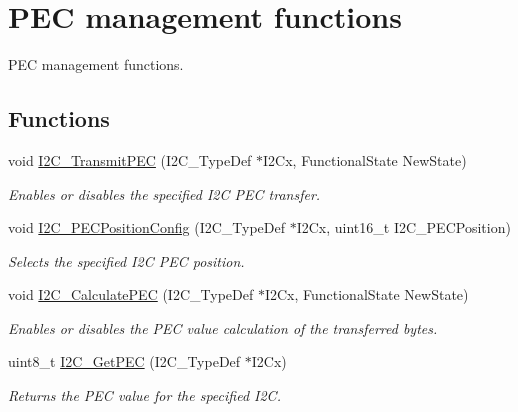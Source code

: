 \hypertarget{group___i2_c___group3}{\section{P\-E\-C management functions}
\label{group___i2_c___group3}
}


P\-E\-C management functions.  


\subsection*{Functions}
\begin{DoxyCompactItemize}
\item 
void \hyperlink{group___i2_c___group3_gaa27d1440290fe601e730b6980999afe3}{I2\-C\-\_\-\-Transmit\-P\-E\-C} (I2\-C\-\_\-\-Type\-Def $\ast$I2\-Cx, Functional\-State New\-State)
\begin{DoxyCompactList}\small\item\em Enables or disables the specified I2\-C P\-E\-C transfer. \end{DoxyCompactList}\item 
void \hyperlink{group___i2_c___group3_ga5d0f939bdd45542502827bf408f24161}{I2\-C\-\_\-\-P\-E\-C\-Position\-Config} (I2\-C\-\_\-\-Type\-Def $\ast$I2\-Cx, uint16\-\_\-t I2\-C\-\_\-\-P\-E\-C\-Position)
\begin{DoxyCompactList}\small\item\em Selects the specified I2\-C P\-E\-C position. \end{DoxyCompactList}\item 
void \hyperlink{group___i2_c___group3_gae86801251359226c35745e0a258388b0}{I2\-C\-\_\-\-Calculate\-P\-E\-C} (I2\-C\-\_\-\-Type\-Def $\ast$I2\-Cx, Functional\-State New\-State)
\begin{DoxyCompactList}\small\item\em Enables or disables the P\-E\-C value calculation of the transferred bytes. \end{DoxyCompactList}\item 
uint8\-\_\-t \hyperlink{group___i2_c___group3_ga7bf75e7c27c0e1d73e70fc0e1c7cd1dd}{I2\-C\-\_\-\-Get\-P\-E\-C} (I2\-C\-\_\-\-Type\-Def $\ast$I2\-Cx)
\begin{DoxyCompactList}\small\item\em Returns the P\-E\-C value for the specified I2\-C. \end{DoxyCompactList}\end{DoxyCompactItemize}


